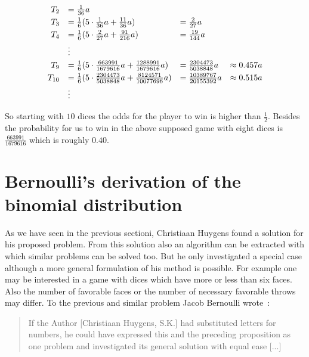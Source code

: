 \begin{align}
  \begin{array}{rlll}
    T_2 & = \frac 1{36} a \nl
    T_3 & = \frac 16 (5 \cdot \frac 1{36} a + \frac{11}{36} a) &= \frac 2{27} a \nl
    T_4 & = \frac 16 (5 \cdot \frac 2{27} a + \frac{91}{216} a) &= \frac {19}{144} a \nl
    & \vdots \nl
    T_9 & = \frac 16 (5 \cdot \frac {663991}{1679616} a + \frac{1288991}{1679616} a) &= \frac {2304473}{5038848} a & \approx 0.457 a \nl
    T_{10} & = \frac 16 (5 \cdot \frac{2304473}{5038848} a + \frac{8124571}{10077696} a) &= \frac{10389767}{20155392} a & \approx 0.515 a \nl
    & \vdots 
  \end{array}
\end{align}

So starting with $10$ dices the odds for the player to win is higher than $\tfrac 12$. Besides the probability for us to win in the above supposed game with eight dices is $\tfrac{663991}{1679616}$ which is roughly $0.40$.

\section{Bernoulli's derivation of the binomial distribution}


As we have seen in the previous sectioni, Christiaan Huygens found a solution for his proposed problem. From this solution also an algorithm can be extracted with which similar problems can be solved too. But he only investigated a special case although a more general formulation of his method is possible. For example one may be interested in a game with dices which have more or less than six faces. Also the number of favorable faces or the number of necessary favorable throws may differ. To the previous and similar problem Jacob Bernoulli wrote~\cite[p. 157]{bernoulli}:

\begin{quotation}
  If the Author [Christiaan Huygens, S.K.] had substituted letters for numbers, he could have expressed this and the preceding proposition as one problem and investigated its general solution with equal ease [...]
\end{quotation}

